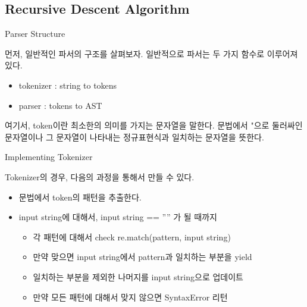 \documentclass{beamer}
\begin{document}
\subsection{Recursive Descent Algorithm}

\begin{frame}{Parser Structure} 

먼저, 일반적인 파서의 구조를 살펴보자. 일반적으로 파서는 두 가지 함수로 이루어져 있다. 

\begin{itemize} 
\item tokenizer : string to tokens
\item parser : tokens to AST
\end{itemize}

여기서, token이란 최소한의 의미를 가지는 문자열을 말한다. 문법에서 "으로 둘러싸인 문자열이나 그 문자열이 나타내는 정규표현식과 일치하는 문자열을 뜻한다. 

\end{frame}

\begin{frame}{Implementing Tokenizer} 

Tokenizer의 경우, 다음의 과정을 통해서 만들 수 있다. 

\begin{itemize} 
\item 문법에서 token의 패턴을 추출한다. 
\item input string에 대해서, input string == '''' 가 될 때까지 
\begin{itemize}
\item 각 패턴에 대해서 check re.match(pattern, input string)
\item 만약 맞으면 input string에서 pattern과 일치하는 부분을 yield
\item 일치하는 부분을 제외한 나머지를 input string으로 업데이트
\item 만약 모든 패턴에 대해서 맞지 않으면 SyntaxError 리턴
\end{itemize}
\end{itemize}
\end{frame}
\end{document}
